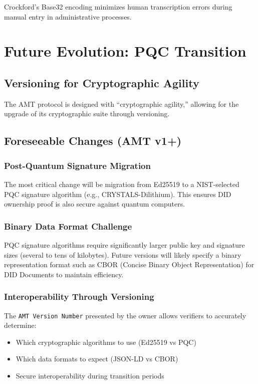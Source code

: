 Crockford's Base32 encoding minimizes human transcription errors during manual entry in administrative processes.

\section{Future Evolution: PQC Transition}

\subsection{Versioning for Cryptographic Agility}

The AMT protocol is designed with ``cryptographic agility,'' allowing for the upgrade of its cryptographic suite through versioning.

\subsection{Foreseeable Changes (AMT v1+)}

\subsubsection{Post-Quantum Signature Migration}

The most critical change will be migration from Ed25519 to a NIST-selected PQC signature algorithm (e.g., CRYSTALS-Dilithium). This ensures DID ownership proof is also secure against quantum computers.

\subsubsection{Binary Data Format Challenge}

PQC signature algorithms require significantly larger public key and signature sizes (several to tens of kilobytes). Future versions will likely specify a binary representation format such as CBOR (Concise Binary Object Representation) for DID Documents to maintain efficiency.

\subsubsection{Interoperability Through Versioning}

The \texttt{AMT Version Number} presented by the owner allows verifiers to accurately determine:
\begin{itemize}
  \item Which cryptographic algorithms to use (Ed25519 vs PQC)
  \item Which data formats to expect (JSON-LD vs CBOR)
  \item Secure interoperability during transition periods
\end{itemize}


